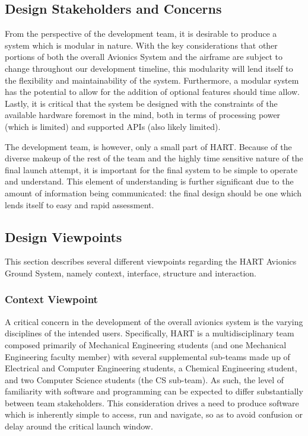 \documentclass[journal,10pt,onecolumn,compsoc]{IEEEtran}
\begin{document}
	\subsection{Design Stakeholders and Concerns}
		\noindent From the perspective of the development team, it is desirable to produce a system which is modular in nature.
		With the key considerations that other portions of both the overall Avionics System and the airframe are subject to change throughout our development timeline, this modularity will lend itself to the flexibility and maintainability of the system.
		Furthermore, a modular system has the potential to allow for the addition of optional features should time allow.
		Lastly, it is critical that the system be designed with the constraints of the available hardware foremost in the mind, both in terms of processing power (which is limited) and supported APIs (also likely limited).
		
		\noindent The development team, is however, only a small part of HART.
		Because of the diverse makeup of the rest of the team and the highly time sensitive nature of the final launch attempt, it is important for the final system to be simple to operate and understand.
		This element of understanding is further significant due to the amount of information being communicated: the final design should be one which lends itself to easy and rapid assessment.

	\subsection{Design Viewpoints}
		\noindent This section describes several different viewpoints regarding the HART Avionics Ground System, namely context, interface, structure and interaction.

		\subsubsection{Context Viewpoint}
			\noindent A critical concern in the development of the overall avionics system is the varying disciplines of the intended users. 
			Specifically, HART is a multidisciplinary team composed primarily of Mechanical Engineering students (and one Mechanical Engineering faculty member) with several supplemental sub-teams made up of Electrical and Computer Engineering students, a Chemical Engineering student, and two Computer Science students (the CS sub-team).
			As such, the level of familiarity with software and programming can be expected to differ substantially between team stakeholders.
			This consideration drives a need to produce software which is inherently simple to access, run and navigate, so as to avoid confusion or delay around the critical launch window. 
\end{document}

